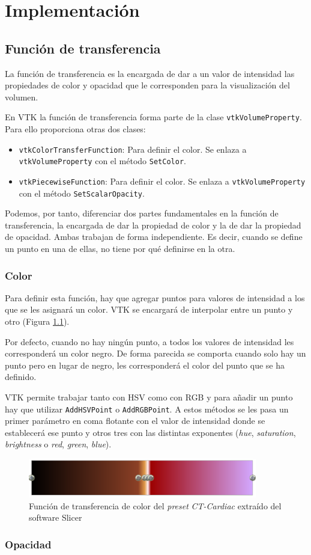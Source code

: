 \chapter{Implementación}

\section{Función de transferencia}

La función de transferencia es la encargada de dar a un valor de intensidad las propiedades de color y opacidad que le corresponden para la visualización del volumen.

En VTK la función de transferencia forma parte de la clase \texttt{vtkVolumeProperty}. Para ello proporciona otras dos clases:
\begin{itemize}
	\item \texttt{vtkColorTransferFunction}: Para definir el color. Se enlaza a \texttt{vtkVolumeProperty} con el método \texttt{SetColor}.
	\item \texttt{vtkPiecewiseFunction}: Para definir el color. Se enlaza a \texttt{vtkVolumeProperty} con el método \texttt{SetScalarOpacity}.
\end{itemize}

Podemos, por tanto, diferenciar dos partes fundamentales en la función de transferencia, la encargada de dar la propiedad de color y la de dar la propiedad de opacidad. Ambas trabajan de forma independiente. Es decir, cuando se define un punto en una de ellas, no tiene por qué definirse en la otra.

\subsection{Color}

Para definir esta función, hay que agregar puntos para valores de intensidad a los que se les asignará un color. VTK se encargará de interpolar entre un punto y otro (Figura \ref{fig:color_tf}). 

Por defecto, cuando no hay ningún punto, a todos los valores de intensidad les corresponderá un color negro. De forma parecida se comporta cuando solo hay un punto pero en lugar de negro, les corresponderá el color del punto que se ha definido.

VTK permite trabajar tanto con HSV como con RGB y para añadir un punto hay que utilizar \texttt{AddHSVPoint} o \texttt{AddRGBPoint}. A estos métodos se les pasa un primer parámetro en coma flotante con el valor de intensidad donde se establecerá ese punto y otros tres con las distintas exponentes (\textit{hue}, \textit{saturation}, \textit{brightness} o \textit{red}, \textit{green}, \textit{blue}).

\begin{figure}[H]
	\centering
	\includegraphics[width=10cm]{imagenes/color_tf}
	\caption{Función de transferencia de color del \textit{preset} \textit{CT-Cardiac} extraído del software Slicer \cite{slicer}}
	\label{fig:color_tf}
\end{figure}

\subsection{Opacidad}

